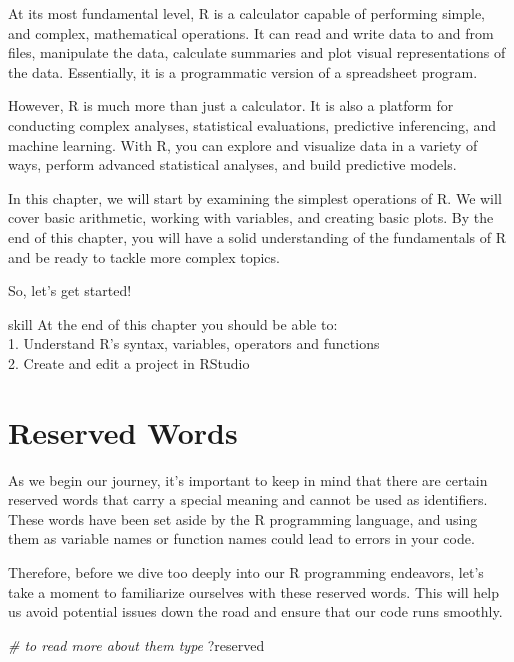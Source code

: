 \documentclass[
]{book}
\newenvironment{Shaded}{\begin{snugshade}}{\end{snugshade}}
\newcommand{\CommentTok}[1]{\textcolor[rgb]{0.56,0.35,0.01}{\textit{#1}}}
\newcommand{\NormalTok}[1]{#1}
\begin{document}
At its most fundamental level, R is a calculator capable of performing simple, and complex, mathematical operations. It can read and write data to and from files, manipulate the data, calculate summaries and plot visual representations of the data. Essentially, it is a programmatic version of a spreadsheet program.

However, R is much more than just a calculator. It is also a platform for conducting complex analyses, statistical evaluations, predictive inferencing, and machine learning. With R, you can explore and visualize data in a variety of ways, perform advanced statistical analyses, and build predictive models.

In this chapter, we will start by examining the simplest operations of R. We will cover basic arithmetic, working with variables, and creating basic plots. By the end of this chapter, you will have a solid understanding of the fundamentals of R and be ready to tackle more complex topics.

So, let's get started!

\begin{infobox}{skill}
At the end of this chapter you should be able to:\\
1. Understand R's syntax, variables, operators and functions\\
2. Create and edit a project in RStudio\\


\end{infobox}

\hypertarget{reserved-words}{%
\section{Reserved Words}\label{reserved-words}}

As we begin our journey, it's important to keep in mind that there are certain reserved words that carry a special meaning and cannot be used as identifiers. These words have been set aside by the R programming language, and using them as variable names or function names could lead to errors in your code.

Therefore, before we dive too deeply into our R programming endeavors, let's take a moment to familiarize ourselves with these reserved words. This will help us avoid potential issues down the road and ensure that our code runs smoothly.

\begin{Shaded}
\begin{Highlighting}[]
\CommentTok{\# to read more about them type}
\NormalTok{?reserved}
\end{Highlighting}
\end{Shaded}
\end{document}
